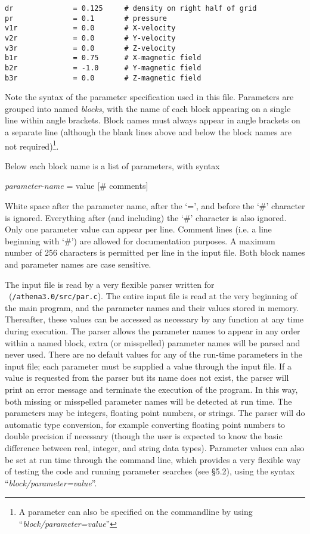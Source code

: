 \begin{verbatim}
dr              = 0.125     # density on right half of grid
pr              = 0.1       # pressure
v1r             = 0.0       # X-velocity
v2r             = 0.0       # Y-velocity
v3r             = 0.0       # Z-velocity
b1r             = 0.75      # X-magnetic field
b2r             = -1.0      # Y-magnetic field
b3r             = 0.0       # Z-magnetic field

\end{verbatim}
\normalsize

Note the syntax of the parameter specification used in this file.  Parameters
are grouped into named
{\it blocks}, with the name of each block appearing on a single line
within angle brackets.  Block names must always appear in angle brackets on
a separate line (although the blank lines above and below the block
names are not 
required)\footnote{A parameter can also be
specified on the commandline by using ``{\it block/parameter=value}''}.

Below each block name is a list of parameters, with syntax
\begin{center}
 {\it parameter-name} = value [\# comments]
\end{center}
White space after the parameter name, after the `=', and before the
`\#' character is ignored.  Everything after (and including) the `\#'
character is also ignored.  Only one parameter value can appear per
line.  Comment lines (i.e. a line beginning with `\#') are allowed for
documentation purposes.  A maximum number of 256 characters is permitted
per line in the input file.  Both block names and parameter names are
case sensitive.

The input file is read by a very flexible parser written for \ath\
({\tt /athena3.0/src/par.c}).  The entire input file is read at the
very beginning of the main program, and the parameter names and their
values stored in memory.  Thereafter, these values can be accessed as
necessary by any function at any time during execution.  The parser
allows the parameter names to appear in any order within a named
block, extra (or misspelled) parameter names will be parsed and never
used.  There are no default values for any of the run-time parameters
in the input file; each parameter must be supplied a value through the
input file.  If a value is requested from the parser but its name does
not exist, the parser will print an error message and terminate the
execution of the program.  In this way, both missing or misspelled
parameter names will be detected at run time.  The parameters may be
integers, floating point numbers, or strings.  The parser will do
automatic type conversion, for example converting floating point
numbers to double precision if necessary (though the user is expected
to know the basic difference between real, integer, and string data
types).  Parameter values can also be set at run time through the
command line, which provides a very flexible way of testing the code
and running parameter searches (see \S 5.2),
using the syntax ``{\it block/parameter=value}''.

